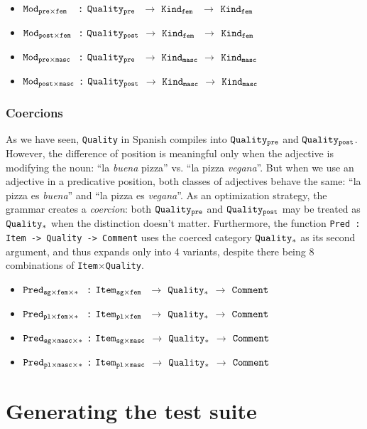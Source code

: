 \documentclass[runningheads]{llncs}
\def\t#1{\texttt{#1}}
\newcommand{\quality}[1]{${\tt Quality_{#1}}$}
\newcommand{\kind}[1]{${\tt Kind_{#1}}$}
\newcommand{\comment}{${\tt Comment}$}
\newcommand{\mod}[2]{${\tt Mod_{#1\times#2}}$}
\newcommand{\pred}[3]{${\tt Pred_{#1\times#2\times#3}}$}
\newcommand{\itemSpa}[2]{${\tt Item_{#1\times#2}}$}
\begin{document}
\begin{itemize}
\item \mod{pre}{fem~~} \t{:} \quality{pre~} $\rightarrow$ \kind{fem~} $\rightarrow$ \kind{fem}
\item  \mod{post}{fem~} \t{:} \quality{post} $\rightarrow$ \kind{fem~} $\rightarrow$ \kind{fem}
\item  \mod{pre}{masc~~}\t{:} \quality{pre~} $\rightarrow$ \kind{masc} $\rightarrow$ \kind{masc}
\item \mod{post}{masc} \t{:} \quality{post} $\rightarrow$ \kind{masc} $\rightarrow$ \kind{masc}
\end{itemize}


\subsubsection{Coercions}
\label{sec:Coercions}
As we have seen, \t{Quality} in Spanish compiles into \quality{pre} and
\quality{post}. However, the difference of position is meaningful only when the
adjective is modifying the noun: ``la \emph{buena} pizza'' vs. ``la pizza
\emph{vegana}''. But when we use an adjective in a predicative position, both
classes of adjectives behave the same: ``la pizza es \emph{buena}''
and ``la pizza es \emph{vegana}''. As an optimization strategy, the
grammar creates a {\it coercion}: both \quality{pre} and \quality{post}
may be treated as \quality{*} when the distinction doesn't matter. 
Furthermore, the function \t{Pred : Item -> Quality -> Comment} uses
the coerced category \quality{*} as its second argument, and thus
expands only into 4 variants, despite there being 8 combinations of
\t{Item}$\times$\t{Quality}.

\begin{itemize}
\item \pred{sg}{fem}{*~} \t{:} \itemSpa{sg}{fem~} $\rightarrow$ \quality{*} $\rightarrow$ \comment
\item  \pred{pl}{fem}{*~} \t{:} \itemSpa{pl}{fem~} $\rightarrow$ \quality{*} $\rightarrow$ \comment
\item  \pred{sg}{masc}{*} \t{:} \itemSpa{sg}{masc} $\rightarrow$ \quality{*} $\rightarrow$ \comment
\item \pred{pl}{masc}{*} \t{:} \itemSpa{pl}{masc} $\rightarrow$ \quality{*} $\rightarrow$ \comment
\end{itemize}

\section{Generating the test suite}
\end{document}
